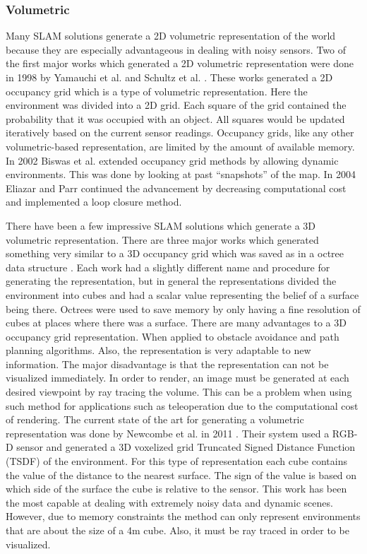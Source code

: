 \subsubsection{Volumetric}

Many SLAM solutions generate a 2D volumetric representation of the world
because they are especially advantageous in dealing with noisy sensors. Two
of the first major works which generated a 2D volumetric representation
were done in 1998 by Yamauchi et al. \cite{Yamauchi1998} and Schultz et al.
\cite{Schultz1998}. These works generated a 2D occupancy grid which is a
type of volumetric representation. Here the environment was divided into a
2D grid.  Each square of the grid contained the probability that it was
occupied with an object. All squares would be updated iteratively based on
the current sensor readings. Occupancy grids, like any other
volumetric-based representation, are limited by the amount of available
memory. In 2002 Biswas et al. \cite{Biswas2002} extended occupancy grid
methods by allowing dynamic environments. This was done by looking at past
``snapshots'' of the map. In 2004 Eliazar and Parr \cite{Eliazar2004}
continued the advancement by decreasing computational cost and implemented
a loop closure method.

There have been a few impressive SLAM solutions which generate a 3D
volumetric representation. There are three major works which generated
something very similar to a 3D occupancy grid which was saved as in a
octree data structure
\cite{Magnusson2007,Nuchter2007,Huang2011,Endres2012}. Each work had a
slightly different name and procedure for generating the representation,
but in general the representations divided the environment into cubes and
had a scalar value representing the belief of a surface being there.
Octrees were used to save memory by only having a fine resolution of cubes
at places where there was a surface. There are many advantages to a 3D
occupancy grid representation. When applied to obstacle avoidance and path
planning algorithms. Also, the representation is very adaptable to new
information. The major disadvantage is that the representation can not be
visualized immediately. In order to render, an image must be generated at
each desired viewpoint by ray tracing the volume. This can be a problem
when using such method for applications such as teleoperation due to the
computational cost of rendering. The current state of the art for
generating a volumetric representation was done by Newcombe et al.  in 2011
\cite{Newcombe2011a}.  Their system used a RGB-D sensor and generated a 3D
voxelized grid Truncated Signed Distance Function (TSDF) of the
environment. For this type of representation each cube contains the value
of the distance to the nearest surface. The sign of the value is based on
which side of the surface the cube is relative to the sensor. This work has
been the most capable at dealing with extremely noisy data and dynamic
scenes. However, due to memory constraints the method can only represent
environments that are about the size of a 4m cube. Also, it must be ray
traced in order to be visualized.

